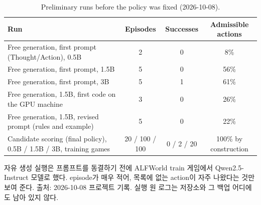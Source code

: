 \begin{table}[htbp]
\centering\small
\caption{Preliminary runs before the policy was fixed (2026-10-08).}\label{tab:a5}
\begin{tabularx}{\linewidth}{@{}Lccc@{}}
\toprule
Run & Episodes & Successes & Admissible actions \\
\midrule
Free generation, first prompt (Thought/Action), 0.5B & 2 & 0 & 8\% \\
Free generation, first prompt, 1.5B & 5 & 0 & 56\% \\
Free generation, first prompt, 3B & 5 & 1 & 61\% \\
Free generation, 1.5B, first code on the GPU machine & 3 & 0 & 26\% \\
Free generation, 1.5B, revised prompt (rules and example) & 5 & 0 & 22\% \\
Candidate scoring (final policy), 0.5B / 1.5B / 3B, training games & 20 / 100 / 100 & 0 / 2 / 20 & 100\% by construction \\
\bottomrule
\end{tabularx}
\par\smallskip\raggedright\footnotesize
자유 생성 실행은 프롬프트를 동결하기 전에 ALFWorld train 게임에서 Qwen2.5-Instruct 모델로 했다. episode가 매우 적어, 목록에 없는 action이 자주 나왔다는 것만 보여 준다. 출처: 2026-10-08 프로젝트 기록. 실행 원 로그는 저장소와 그 백업 어디에도 남아 있지 않다.
\end{table}
